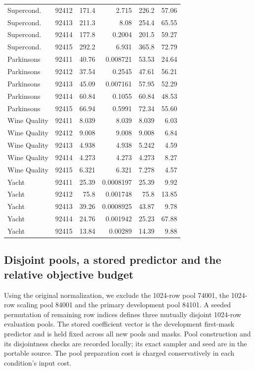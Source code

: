 \begin{table}[t]
\begin{tabular}{llrrrr}
Supercond. & 92412 & 171.4 & 2.715 & 226.2 & 57.06\\
Supercond. & 92413 & 211.3 & 8.08 & 254.4 & 65.55\\
Supercond. & 92414 & 177.8 & 0.2004 & 201.5 & 59.27\\
Supercond. & 92415 & 292.2 & 6.931 & 365.8 & 72.79\\
Parkinsons & 92411 & 40.76 & 0.008721 & 53.53 & 24.64\\
Parkinsons & 92412 & 37.54 & 0.2545 & 47.61 & 56.21\\
Parkinsons & 92413 & 45.09 & 0.007161 & 57.95 & 52.29\\
Parkinsons & 92414 & 60.84 & 0.1055 & 60.84 & 48.53\\
Parkinsons & 92415 & 66.94 & 0.5991 & 72.34 & 55.60\\
Wine Quality & 92411 & 8.039 & 8.039 & 8.039 & 6.03\\
Wine Quality & 92412 & 9.008 & 9.008 & 9.008 & 6.84\\
Wine Quality & 92413 & 4.938 & 4.938 & 5.242 & 4.59\\
Wine Quality & 92414 & 4.273 & 4.273 & 4.273 & 8.27\\
Wine Quality & 92415 & 6.321 & 6.321 & 7.278 & 4.57\\
Yacht & 92411 & 25.39 & 0.0008197 & 25.39 & 9.92\\
Yacht & 92412 & 75.8 & 0.001748 & 75.8 & 13.85\\
Yacht & 92413 & 39.26 & 0.0008925 & 43.87 & 9.78\\
Yacht & 92414 & 24.76 & 0.001942 & 25.23 & 67.88\\
Yacht & 92415 & 13.84 & 0.00289 & 14.39 & 9.88\\
\midrule
\bottomrule\end{tabular}\end{table}
\subsection{Disjoint pools, a stored predictor and the relative objective budget}
Using the original normalization, we exclude the 1024-row pool 74001, the 1024-row scaling pool 84001 and the primary development pool 84101. A seeded permutation of remaining row indices defines three mutually disjoint 1024-row evaluation pools. The stored coefficient vector is the development first-mask predictor and is held fixed across all new pools and masks. Pool construction and its disjointness checks are recorded locally; its exact sampler and seed are in the portable source. The pool preparation cost is charged conservatively in each condition's input cost.

